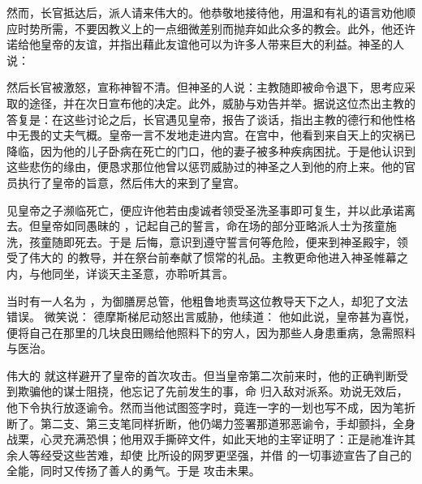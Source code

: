然而，长官抵达后，派人请来伟大的。他恭敬地接待他，用温和有礼的语言劝他顺应时势所需，不要因教义上的一点细微差别而抛弃如此众多的教会。此外，他还许诺给他皇帝的友谊，并指出藉此友谊他可以为许多人带来巨大的利益。神圣的人说：\par

然后长官被激怒，宣称神智不清。但神圣的人说：主教随即被命令退下，思考应采取的途径，并在次日宣布他的决定。此外，威胁与劝告并举。据说这位杰出主教的答复是：在这些讨论之后，长官遇见皇帝，报告了谈话，指出主教的德行和他性格中无畏的丈夫气概。皇帝一言不发地走进内宫。在宫中，他看到来自天上的灾祸已降临，因为他的儿子卧病在死亡的门口，他的妻子被多种疾病困扰。于是他认识到这些悲伤的缘由，便恳求那位他曾以惩罚威胁过的神圣之人到他的府上来。他的官员执行了皇帝的旨意，然后伟大的来到了皇宫。\par

 见皇帝之子濒临死亡，便应许他若由虔诚者领受圣洗圣事即可复生，并以此承诺离去。但皇帝如同愚昧的 ，记起自己的誓言，命在场的部分亚略派人士为孩童施洗，孩童随即死去。于是  后悔，意识到遵守誓言何等危险，便来到神圣殿宇，领受了伟大的  的教导，并在祭台前奉献了惯常的礼品。主教更命他进入神圣帷幕之内，与他同坐，详谈天主圣意，亦聆听其言。\par

当时有一人名为 ，为御膳房总管，他粗鲁地责骂这位教导天下之人，却犯了文法错误。 微笑说： 德摩斯梯尼动怒出言威胁，他续道： 他如此说，皇帝甚为喜悦，便将自己在那里的几块良田赐给他照料下的穷人，因为那些人身患重病，急需照料与医治。\par

伟大的  就这样避开了皇帝的首次攻击。但当皇帝第二次前来时，他的正确判断受到欺骗他的谋士阻挠，他忘记了先前发生的事，命  归入敌对派系。劝说无效后，他下令执行放逐谕令。然而当他试图签字时，竟连一字的一划也写不成，因为笔折断了。第二支、第三支笔同样折断，他仍竭力签署那道邪恶谕令，手却颤抖，全身战栗，心灵充满恐惧；他用双手撕碎文件，如此天地的主宰证明了：正是祂准许其余人等经受这些苦难，却使  比所设的网罗更坚强，并借  的一切事迹宣告了自己的全能，同时又传扬了善人的勇气。于是  攻击未果。\par

